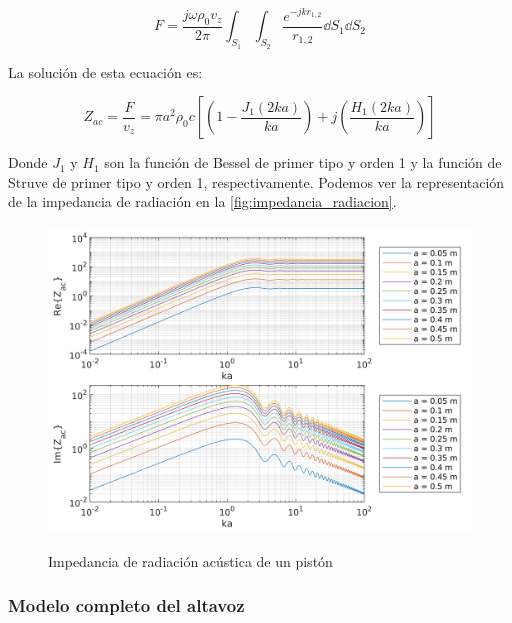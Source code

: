 \documentclass[12pt, a4paper]{article}
\begin{document}
\begin{equation} \label{eq:presion_de_2_sobre_1}
    F = \frac{j\omega \rho_0 v_z}{2\pi} \int_{S_1} \int_{S_2} \frac{e^{-jkr_{1,2}}}{r_{1,2}} \dd S_1 \dd S_2    
\end{equation}

La solución de esta ecuación es:

\begin{equation} \label{eq:impedancia_piston}
    Z_{ac} = \frac{F}{v_z} = \pi a^2 \rho_0 c \left[ \left( 1 - \frac{J_1 (2ka)}{ka}  \right) + j \left( \frac{H_1 (2ka)}{ka} \right)\right]
\end{equation}

Donde $J_1$ y $H_1$ son la función de Bessel de primer tipo y orden 1 y la función de Struve de primer tipo y orden 1, respectivamente. Podemos ver la representación de la impedancia de radiación en la \autoref{fig:impedancia_radiacion}.

\begin{figure}[htp]
    \centering
    \caption{Impedancia de radiación acústica de un pistón}
    \includegraphics[width=\linewidth]{images/acoustic_radiation_impedance.png}
\label{fig:impedancia_radiacion}
\end{figure}



\subsubsection{Modelo completo del altavoz}
\end{document}
